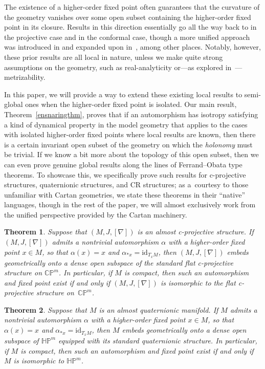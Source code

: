 \documentclass[10pt,a4paper]{amsart}
\numberwithin{equation}{section}
\newtheorem{mainthm}{Theorem}
\theoremstyle{definition}
\begin{document}
The existence of a higher-order fixed point often guarantees that the curvature of the geometry vanishes over some open subset containing the higher-order fixed point in its closure. Results in this direction essentially go all the way back to \cite{NaganoOchiai} in the projective case and \cite{Frances2012} in the conformal case, though a more unified approach was introduced in \cite{CapMelnick2013} and expanded upon in~\cite{KruglikovThe2018,MelnickNeusser2016}, among other places. Notably, however, these prior results are all local in nature, unless we make quite strong assumptions on the geometry, such as real-analyticity or---as explored in~\cite{TianyuMa, NaganoOchiai}---metrizability.

In this paper, we will provide a way to extend these existing local results to semi-global ones when the higher-order fixed point is isolated. Our main result, Theorem~\ref{ensnaringthm}, proves that if an automorphism has isotropy satisfying a kind of dynamical property in the model geometry that applies to the cases with isolated higher-order fixed points where local results are known, then there is a certain invariant open subset of the geometry on which the \emph{holonomy} must be trivial. If we know a bit more about the topology of this open subset, then we can even prove genuine global results along the lines of Ferrand--Obata type theorems. To showcase this, we specifically prove such results for c-projective structures, quaternionic structures, and CR structures; as a~courtesy to those unfamiliar with Cartan geometries, we state these theorems in their ``native'' languages, though in the rest of the paper, we will almost exclusively work from the unified perspective provided by the Cartan machinery.

\begin{mainthm}\label{thmA} Suppose that $(M,J,[\nabla])$ is an almost c-projective structure.
If $(M,J,[\nabla])$ admits a nontrivial automorphism $\alpha$ with a higher-order fixed point $x\in M$, so that $\alpha(x)=x$ and $\alpha_{*x}=\mathrm{id}_{T_xM}$, then $(M,J,[\nabla])$ embeds geometrically onto a dense open subspace of the standard flat c-projective structure on $\mathbb{CP}^m$. In particular, if $M$ is compact, then such an automorphism and fixed point exist if and only if $(M,J,[\nabla])$ is isomorphic to the flat c-projective structure on~$\mathbb{CP}^m$.\end{mainthm}

\begin{mainthm}\label{thmB} Suppose that $M$ is an almost quaternionic manifold. If $M$ admits a nontrivial automorphism $\alpha$ with a higher-order fixed point $x\in M$, so that $\alpha(x)=x$ and $\alpha_{*x}=\mathrm{id}_{T_xM}$, then $M$ embeds geometrically onto a dense open subspace of $\mathbb{HP}^m$ equipped with its standard quaternionic structure. In particular, if $M$ is compact, then such an automorphism and fixed point exist if and only if $M$ is isomorphic to $\mathbb{HP}^m$.\end{mainthm}
\end{document}
